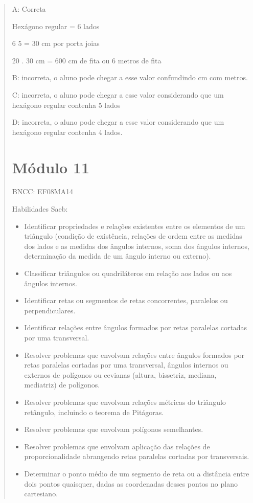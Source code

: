 \begin{quote}
\begin{escolha}
A: Correta

Hexágono regular = 6 lados

\num{6} 5 = 30 cm por porta joias

20 . 30 cm = 600 cm de fita ou 6 metros de fita

B: incorreta, o aluno pode chegar a esse valor confundindo cm com
metros.

C: incorreta, o aluno pode chegar a esse valor considerando que um
hexágono regular contenha 5 lados

D: incorreta, o aluno pode chegar a esse valor considerando que um
hexágono regular contenha 4 lados.

\chapter{Módulo 11}

BNCC: EF08MA14

Habilidades Saeb:

\begin{itemize}
\item
  Identificar propriedades e relações existentes entre os elementos de
  um triângulo (condição de existência, relações de ordem entre as
  medidas dos lados e as medidas dos ângulos internos, soma dos ângulos
  internos, determinação da medida de um ângulo interno ou externo).
\item
  Classificar triângulos ou quadriláteros em relação aos lados ou aos
  ângulos internos.
\item
  Identificar retas ou segmentos de retas concorrentes, paralelos ou
  perpendiculares.
\item
  Identificar relações entre ângulos formados por retas paralelas
  cortadas por uma transversal.
\item
  Resolver problemas que envolvam relações entre ângulos formados por
  retas paralelas cortadas por uma transversal, ângulos internos ou
  externos de polígonos ou cevianas (altura, bissetriz, mediana,
  mediatriz) de polígonos.
\item
  Resolver problemas que envolvam relações métricas do triângulo
  retângulo, incluindo o teorema de Pitágoras.
\item
  Resolver problemas que envolvam polígonos semelhantes.
\item
  Resolver problemas que envolvam aplicação das relações de
  proporcionalidade abrangendo retas paralelas cortadas por
  transversais.
\item
  Determinar o ponto médio de um segmento de reta ou a distância entre
  dois pontos quaisquer, dadas as coordenadas desses pontos no plano
  cartesiano.
\end{itemize}


\end{escolha}
\end{quote}
